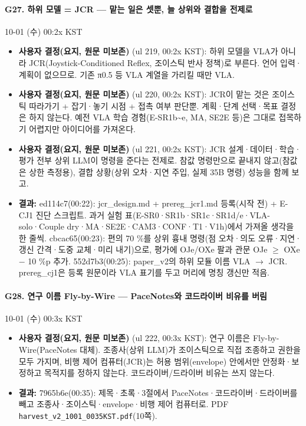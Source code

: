 \paragraph{G27. 하위 모델 = JCR --- 맡는 일은 셋뿐, 늘 상위와 결합을 전제로}
{\small 10-01 (수) 00:2x KST}
\begin{itemize}
  \item \textbf{사용자 결정(요지, 원문 미보존)} (ul 219, 00:2x KST): 하위 모델을 VLA가 아니라 JCR(Joystick-Conditioned Reflex, 조이스틱 반사 정책)로 부른다. 언어 입력·계획이 없으므로. 기존 π0.5 등 VLA 계열을 가리킬 때만 VLA.
  \item \textbf{사용자 결정(요지, 원문 미보존)} (ul 220, 00:2x KST): JCR이 맡는 것은 조이스틱 따라가기 + 잡기·놓기 시점 + 접촉 여부 판단뿐. 계획·단계 선택·목표 결정은 하지 않는다. 예전 VLA 학습 경험(E-SR1b\textasciitilde{}e, MA, SE2E 등)은 그대로 접목하기 어렵지만 아이디어를 가져온다.
  \item \textbf{사용자 결정(요지, 원문 미보존)} (ul 221, 00:2x KST): JCR 설계·데이터·학습·평가 전부 상위 LLM이 명령을 준다는 전제로. 참값 명령만으로 끝내지 않고(참값은 상한 측정용), 결합 상황(상위 오차·지연 주입, 실제 35B 명령) 성능을 함께 보고.
  \item \textbf{결과:} ed114c7(00:22): jcr\_design.md + prereg\_jcr1.md 등록(시작 전) + E-CJ1 진단 스크립트. 과거 실험 표(E-SR0·SR1b·SR1c·SR1d/e·VLA-solo·Couple dry·MA·SE2E·CAM3·CONF·T1·V1h)에서 가져올 생각을 한 줄씩. cbcac65(00:23): 편의 70 \%를 상위 흉내 명령(점 오차·의도 오류·지연·갱신 간격·도중 교체·미리 내기)으로, 평가에 OJe/OXe 팔과 관문 OJe $\geq$ OXe $-$ 10 \%p 추가. 552d7b3(00:25): paper\_v2의 하위 모듈 이름 VLA $\rightarrow$ JCR. prereg\_cj1은 등록 원문이라 VLA 표기를 두고 머리에 명칭 갱신만 적음.
\end{itemize}

\paragraph{G28. 연구 이름 Fly-by-Wire --- PaceNotes와 코드라이버 비유를 버림}
{\small 10-01 (수) 00:3x KST}
\begin{itemize}
  \item \textbf{사용자 결정(요지, 원문 미보존)} (ul 222, 00:3x KST): 연구 이름은 Fly-by-Wire(PaceNotes 대체). 조종사(상위 LLM)가 조이스틱으로 직접 조종하고 권한을 모두 가지며, 비행 제어 컴퓨터(JCR)는 허용 범위(envelope) 안에서만 안정화·보정하고 목적지를 정하지 않는다. 코드라이버/드라이버 비유는 쓰지 않는다.
  \item \textbf{결과:} 7965b6e(00:35): 제목·초록·3절에서 PaceNotes·코드라이버·드라이버를 빼고 조종사·조이스틱·envelope·비행 제어 컴퓨터로. PDF \texttt{harvest\_\allowbreak{}v2\_\allowbreak{}1001\_\allowbreak{}0035KST.\allowbreak{}pdf}(10쪽).
\end{itemize}

